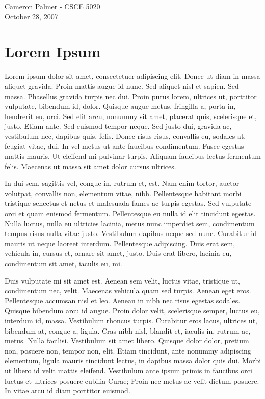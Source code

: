\documentclass[12pt,twoside,letterpaper]{article}
\begin{document}
Cameron Palmer - CSCE 5020 \\
October 28, 2007

\section*{Lorem Ipsum}

Lorem ipsum dolor sit amet, consectetuer adipiscing elit. Donec ut diam in massa aliquet gravida. Proin mattis augue id nunc. Sed aliquet nisl et sapien. Sed massa. Phasellus gravida turpis nec dui. Proin purus lorem, ultrices ut, porttitor vulputate, bibendum id, dolor. Quisque augue metus, fringilla a, porta in, hendrerit eu, orci. Sed elit arcu, nonummy sit amet, placerat quis, scelerisque et, justo. Etiam ante. Sed euismod tempor neque. Sed justo dui, gravida ac, vestibulum nec, dapibus quis, felis. Donec risus risus, convallis eu, sodales at, feugiat vitae, dui. In vel metus ut ante faucibus condimentum. Fusce egestas mattis mauris. Ut eleifend mi pulvinar turpis. Aliquam faucibus lectus fermentum felis. Maecenas ut massa sit amet dolor cursus ultrices.

In dui sem, sagittis vel, congue in, rutrum et, est. Nam enim tortor, auctor volutpat, convallis non, elementum vitae, nibh. Pellentesque habitant morbi tristique senectus et netus et malesuada fames ac turpis egestas. Sed vulputate orci et quam euismod fermentum. Pellentesque eu nulla id elit tincidunt egestas. Nulla luctus, nulla eu ultricies lacinia, metus nunc imperdiet sem, condimentum tempus risus nulla vitae justo. Vestibulum dapibus neque sed nunc. Curabitur id mauris ut neque laoreet interdum. Pellentesque adipiscing. Duis erat sem, vehicula in, cursus et, ornare sit amet, justo. Duis erat libero, lacinia eu, condimentum sit amet, iaculis eu, mi.

Duis vulputate mi sit amet est. Aenean sem velit, luctus vitae, tristique ut, condimentum nec, velit. Maecenas vehicula quam sed turpis. Aenean eget eros. Pellentesque accumsan nisl et leo. Aenean in nibh nec risus egestas sodales. Quisque bibendum arcu id augue. Proin dolor velit, scelerisque semper, luctus eu, interdum id, massa. Vestibulum rhoncus turpis. Curabitur eros lacus, ultrices ut, bibendum at, congue a, ligula. Cras nibh nisl, blandit et, iaculis in, rutrum ac, metus. Nulla facilisi. Vestibulum sit amet libero. Quisque dolor dolor, pretium non, posuere non, tempor non, elit. Etiam tincidunt, ante nonummy adipiscing elementum, ligula mauris tincidunt lectus, in dapibus massa dolor quis dui. Morbi ut libero id velit mattis eleifend. Vestibulum ante ipsum primis in faucibus orci luctus et ultrices posuere cubilia Curae; Proin nec metus ac velit dictum posuere. In vitae arcu id diam porttitor euismod.
\end{document}
